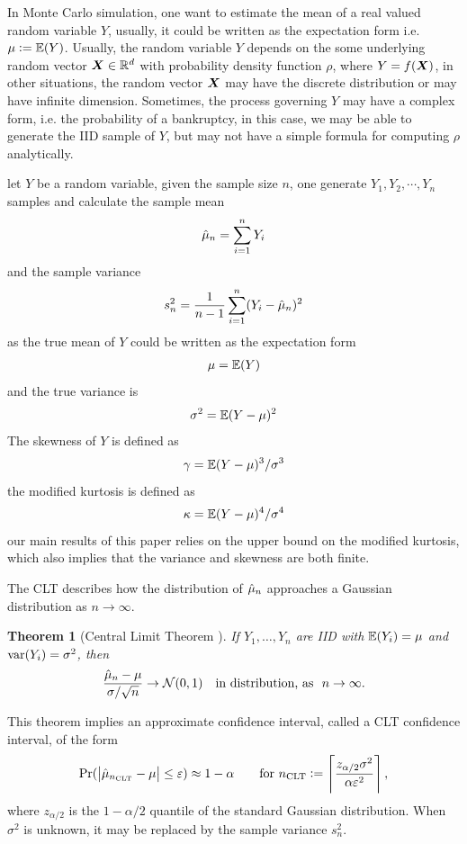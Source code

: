 \documentclass{iitthesis}
\newtheorem{theorem}{Theorem}[section]
\begin{document}
\label{basicInequalities}
In Monte Carlo simulation, one want to estimate the mean of a real valued random variable $Y$, usually, it could be written as the expectation form i.e. $\mu:=\mathbb{E}(Y)$. Usually, the random variable $Y$ depends on the some underlying random vector $\boldsymbol{X} \in \mathbb{R}^d$ with probability density function $\rho$, where $Y = f(\boldsymbol{X})$, in other situations, the random vector $\boldsymbol{X}$ may have the discrete distribution or may have infinite dimension. Sometimes, the process governing
$Y$ may have a complex form,  i.e. the probability of a bankruptcy, in this case, we may be able to generate the IID sample of $Y$, but may not have a simple formula for computing $\rho$ analytically. 

let $Y$ be a random variable, given the sample size $n$, one generate $Y_1, Y_2, \cdots, Y_n$ samples and calculate the sample mean 
\begin{align}\label{samplemean}
\hat{\mu}_n = \sum_{i=1}^n Y_i
\end{align}
and the sample variance
\begin{align}\label{samplevar}
s^2_n = \frac{1}{n-1}\sum_{i=1}^n (Y_i-\hat{\mu}_n)^2
\end{align}
as the true mean of $Y$ could be written as the expectation form
\begin{align}\label{truemean}
\mu = \mathbb{E}(Y)
\end{align}
and the true variance is
\begin{align}\label{truevar}
\sigma^2 = \mathbb{E}(Y-\mu)^2
\end{align}
The skewness of $Y$ is defined as 
\begin{align}\label{screwness}
\gamma = \mathbb{E}(Y-\mu)^3/\sigma^3
\end{align}
the modified kurtosis is defined as
\begin{align}\label{kurtosis}
\kappa = \mathbb{E}(Y-\mu)^4/\sigma^4
\end{align}
our main results of this paper relies on the upper bound on the modified kurtosis, which also implies that the variance and skewness are both finite.

The CLT describes how the distribution of $\hat{\mu}_n$ approaches a Gaussian distribution as $n \to \infty$.
\begin{theorem}[Central Limit Theorem {\cite[Theorem 21.1]{JP04}}] \label{clt} 
If $Y_1, \ldots, Y_n$ are IID with $\mathbb{E}(Y_i)=\mu$ and $\operatorname{var}(Y_i) = \sigma^2$, then
$$
\frac{\hmu_n-\mu}{\sigma/\sqrt{n}} \to \dnorm(0,1) \quad \text{in distribution, as} \ \ n\to\infty.
$$
\end{theorem}
This theorem implies an approximate confidence interval, called a CLT confidence interval, of the form
\[
\Pr(\left \lvert \hat{\mu}_{n_{\text{CLT}}}-\mu \right \rvert \le \varepsilon) \approx 1- \alpha \qquad \text{for } n_{\text{CLT}} := \left \lceil \frac{z_{\alpha/2}\sigma^2}{\alpha \varepsilon^2} \right \rceil,
\]
where $z_{\alpha/2}$ is the $1-\alpha/2$ quantile of the standard Gaussian distribution.  When $\sigma^2$ is unknown, it may be replaced by the sample variance $s_n^2$.
\end{document}
